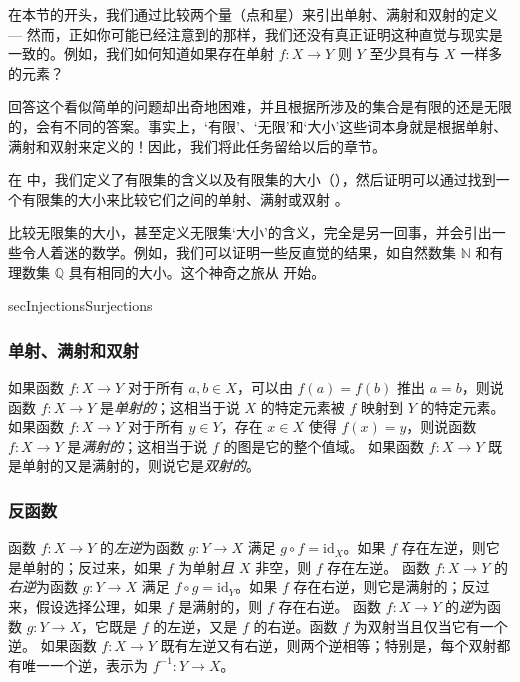 在本节的开头，我们通过比较两个量（点和星）来引出单射、满射和双射的定义 --- 然而，正如你可能已经注意到的那样，我们还没有真正证明这种直觉与现实是一致的。例如，我们如何知道如果存在单射 $f : X \to Y$ 则 $Y$ 至少具有与 $X$ 一样多的元素？

回答这个看似简单的问题却出奇地困难，并且根据所涉及的集合是有限的还是无限的，会有不同的答案。事实上，`有限'、`无限'和`大小'这些词本身就是根据单射、满射和双射来定义的！因此，我们将此任务留给以后的章节。

在  中，我们定义了有限集的含义以及有限集的大小（），然后证明可以通过找到一个有限集的大小来比较它们之间的单射、满射或双射 。

比较无限集的大小，甚至定义无限集`大小'的含义，完全是另一回事，并会引出一些令人着迷的数学。例如，我们可以证明一些反直觉的结果，如自然数集 $\mathbb{N}$ 和有理数集 $\mathbb{Q}$ 具有相同的大小。这个神奇之旅从  开始。

\begin{tldr}{secInjectionsSurjections}

\subsubsection*{单射、满射和双射}

\begin{tldrlist}
 如果函数 $f : X \to Y$ 对于所有 $a,b \in X$，可以由 $f(a)=f(b)$ 推出 $a=b$，则说函数 $f : X \to Y$ 是\textit{单射的}；这相当于说 $X$ 的特定元素被 $f$ 映射到 $Y$ 的特定元素。
 如果函数 $f : X \to Y$ 对于所有 $y \in Y$，存在 $x \in X$ 使得 $f(x)=y$，则说函数 $f : X \to Y$ 是\textit{满射的}；这相当于说 $f$ 的图是它的整个值域。
 如果函数 $f : X \to Y$ 既是单射的又是满射的，则说它是\textit{双射的}。
\end{tldrlist}

\subsubsection*{反函数}

\begin{tldrlist}
 函数 $f : X \to Y$ 的\textit{左逆}为函数 $g : Y \to X$ 满足 $g \circ f = \mathrm{id}_X$。如果 $f$ 存在左逆，则它是单射的；反过来，如果 $f$ 为单射\textit{且} $X$ 非空，则 $f$ 存在左逆。
 函数 $f : X \to Y$ 的\textit{右逆}为函数 $g : Y \to X$ 满足 $f \circ g = \mathrm{id}_Y$。如果 $f$ 存在右逆，则它是满射的；反过来，假设选择公理，如果 $f$ 是满射的，则 $f$ 存在右逆。
 函数 $f : X \to Y$ 的\textit{逆}为函数 $g : Y \to X$，它既是 $f$ 的左逆，又是 $f$ 的右逆。函数 $f$ 为双射当且仅当它有一个逆。
 如果函数 $f : X \to Y$ 既有左逆又有右逆，则两个逆相等；特别是，每个双射都有唯一一个逆，表示为 $f^{-1} : Y \to X$。
\end{tldrlist}

\end{tldr}

